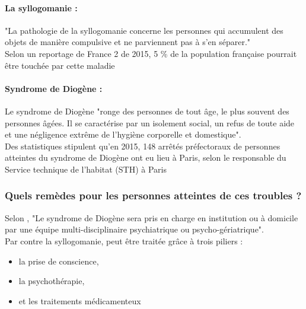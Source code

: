 \documentclass[a4paper,12pt]{report}
\begin{document}
\paragraph*{La syllogomanie :}
"La pathologie de la syllogomanie concerne les personnes qui accumulent des objets de manière compulsive et ne parviennent pas à s'en séparer." \cite{ref20}\\
Selon un reportage de France 2 de 2015, 5 \% de la population française pourrait être touchée par cette maladie \cite{ref20}
\paragraph*{Syndrome de Diogène :}
Le syndrome de Diogène "ronge des personnes de tout âge, le plus souvent des personnes âgées. Il se caractérise par un isolement social, un refus de toute aide et une négligence extrême de l'hygiène corporelle et domestique". \cite{ref21}\\
Des statistiques stipulent qu'en 2015, 148 arrêtés préfectoraux de personnes atteintes du syndrome de Diogène ont eu lieu à Paris, selon le responsable du Service technique de l'habitat (STH) à Paris \cite{ref21}
\subsubsection*{Quels remèdes pour les personnes atteintes de ces troubles ?}
Selon \cite{ref27}, "Le syndrome de Diogène sera pris en charge en institution ou à domicile par une équipe multi-disciplinaire psychiatrique ou psycho-gériatrique".\\
Par contre la syllogomanie, peut être traitée grâce à trois piliers :
\begin{itemize}
\item la prise de conscience,
\item la psychothérapie,
\item et les traitements médicamenteux
\end{itemize}
\end{document}
